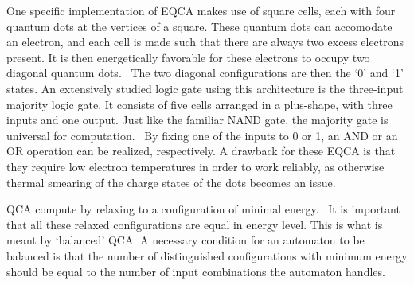 \documentclass[10pt,a4paper]{article}
\begin{document}
One specific implementation of EQCA makes use of square cells, each with four quantum dots at the vertices of a square. These quantum dots can accomodate an electron, and each cell is made such that there are always two excess electrons present. It is then energetically favorable for these electrons to occupy two diagonal quantum dots.~\cite{QCA_DigitalLogicGate} The two diagonal configurations are then the `0' and `1' states. An extensively studied logic gate using this architecture is the three-input majority logic gate. It consists of five cells arranged in a plus-shape, with three inputs and one output. Just like the familiar NAND gate, the majority gate is universal for computation.~\cite{NML_Carlton} By fixing one of the inputs to 0 or 1, an AND or an OR operation can be realized, respectively. A drawback for these EQCA is that they require low electron temperatures in order to work reliably, as otherwise thermal smearing of the charge states of the dots becomes an issue.~\cite{QCA_DigitalLogicGate} \par
QCA compute by relaxing to a configuration of minimal energy.~\cite{QCA_Algorithms} It is important that all these relaxed configurations are equal in energy level. This is what is meant by `balanced' QCA. A necessary condition for an automaton to be balanced is that the number of distinguished configurations with minimum energy should be equal to the number of input combinations the automaton handles.~\cite{QCA_Algorithms}
\end{document}
